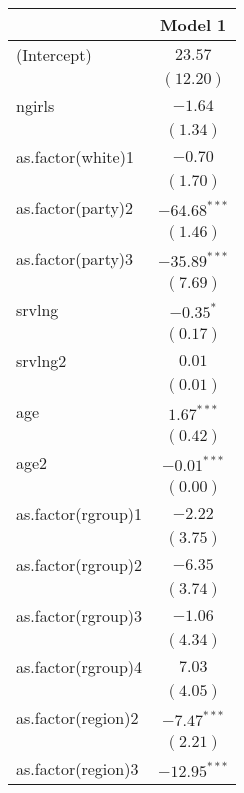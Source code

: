 \documentclass{article}
\begin{document}


\begin{table}
\begin{center}
\begin{tabular}{l c }
\hline
 & Model 1 \\
\hline
(Intercept)         & $23.57$        \\
                    & $(12.20)$      \\
ngirls              & $-1.64$        \\
                    & $(1.34)$       \\
as.factor(white)1   & $-0.70$        \\
                    & $(1.70)$       \\
as.factor(party)2   & $-64.68^{***}$ \\
                    & $(1.46)$       \\
as.factor(party)3   & $-35.89^{***}$ \\
                    & $(7.69)$       \\
srvlng              & $-0.35^{*}$    \\
                    & $(0.17)$       \\
srvlng2             & $0.01$         \\
                    & $(0.01)$       \\
age                 & $1.67^{***}$   \\
                    & $(0.42)$       \\
age2                & $-0.01^{***}$  \\
                    & $(0.00)$       \\
as.factor(rgroup)1  & $-2.22$        \\
                    & $(3.75)$       \\
as.factor(rgroup)2  & $-6.35$        \\
                    & $(3.74)$       \\
as.factor(rgroup)3  & $-1.06$        \\
                    & $(4.34)$       \\
as.factor(rgroup)4  & $7.03$         \\
                    & $(4.05)$       \\
as.factor(region)2  & $-7.47^{***}$  \\
                    & $(2.21)$       \\
as.factor(region)3  & $-12.95^{***}$ \\

\end{tabular}
\end{center}
\end{table}
\end{document}
